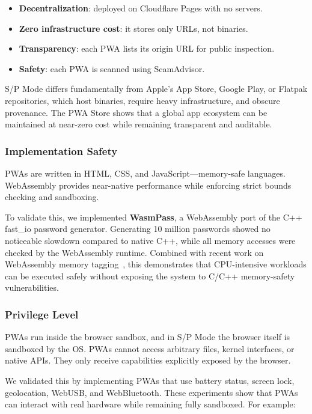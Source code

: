 \begin{itemize}
    \item \textbf{Decentralization}: deployed on Cloudflare Pages with no servers.
    \item \textbf{Zero infrastructure cost}: it stores only URLs, not binaries.
    \item \textbf{Transparency}: each PWA lists its origin URL for public inspection.
    \item \textbf{Safety}: each PWA is scanned using ScamAdvisor.
\end{itemize}

S/P Mode differs fundamentally from Apple’s App Store, Google Play, or Flatpak repositories, which host binaries, require heavy infrastructure, and obscure provenance. The PWA Store shows that a global app ecosystem can be maintained at near-zero cost while remaining transparent and auditable.

\subsubsection{Implementation Safety}

PWAs are written in HTML, CSS, and JavaScript—memory-safe languages. WebAssembly provides near-native performance while enforcing strict bounds checking and sandboxing.

To validate this, we implemented \textbf{WasmPass}, a WebAssembly port of the C++ fast\_io password generator. Generating 10 million passwords showed no noticeable slowdown compared to native C++, while all memory accesses were checked by the WebAssembly runtime. Combined with recent work on WebAssembly memory tagging~\cite{wasmMemoryTagging2024}, this demonstrates that CPU-intensive workloads can be executed safely without exposing the system to C/C++ memory-safety vulnerabilities.

\subsubsection{Privilege Level}

PWAs run inside the browser sandbox, and in S/P Mode the browser itself is sandboxed by the OS. PWAs cannot access arbitrary files, kernel interfaces, or native APIs. They only receive capabilities explicitly exposed by the browser.

We validated this by implementing PWAs that use battery status, screen lock, geolocation, WebUSB, and WebBluetooth. These experiments show that PWAs can interact with real hardware while remaining fully sandboxed. For example:

